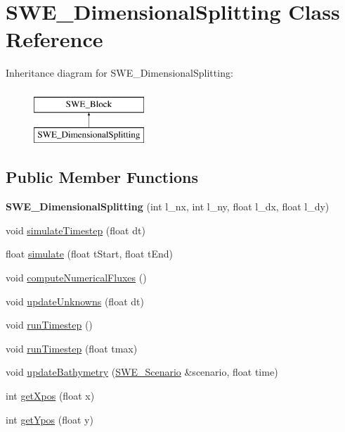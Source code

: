 \hypertarget{classSWE__DimensionalSplitting}{\section{S\-W\-E\-\_\-\-Dimensional\-Splitting Class Reference}
\label{classSWE__DimensionalSplitting}
}
Inheritance diagram for S\-W\-E\-\_\-\-Dimensional\-Splitting\-:\begin{figure}[H]
\begin{center}
\leavevmode
\includegraphics[height=2.000000cm]{classSWE__DimensionalSplitting}
\end{center}
\end{figure}
\subsection*{Public Member Functions}
\begin{DoxyCompactItemize}
\item 
\hypertarget{classSWE__DimensionalSplitting_a3ab0c9de647ca241dbab1aa02cc42a04}{{\bfseries S\-W\-E\-\_\-\-Dimensional\-Splitting} (int l\-\_\-nx, int l\-\_\-ny, float l\-\_\-dx, float l\-\_\-dy)}\label{classSWE__DimensionalSplitting_a3ab0c9de647ca241dbab1aa02cc42a04}

\item 
void \hyperlink{classSWE__DimensionalSplitting_a205a7f520d5c809d940273f09f22661f}{simulate\-Timestep} (float dt)
\item 
float \hyperlink{classSWE__DimensionalSplitting_a7f922283cd593ed0f09a177e9167ef77}{simulate} (float t\-Start, float t\-End)
\item 
void \hyperlink{classSWE__DimensionalSplitting_a84759f8fbbbfe1e46613375515826f0f}{compute\-Numerical\-Fluxes} ()
\item 
void \hyperlink{classSWE__DimensionalSplitting_af74b527ff9ca7727442db92d2e438531}{update\-Unknowns} (float dt)
\item 
void \hyperlink{classSWE__DimensionalSplitting_a41bfc084f565416d3c1c3e9a38bf104c}{run\-Timestep} ()
\item 
void \hyperlink{classSWE__DimensionalSplitting_a24764ff5688b84190e48df61ad44a453}{run\-Timestep} (float tmax)
\item 
void \hyperlink{classSWE__DimensionalSplitting_a874f2fabea21f0c6fbdd447844f7587e}{update\-Bathymetry} (\hyperlink{classSWE__Scenario}{S\-W\-E\-\_\-\-Scenario} \&scenario, float time)
\item 
int \hyperlink{classSWE__DimensionalSplitting_acdb957c5955f90997c48917bf14d6bd4}{get\-Xpos} (float x)
\item 
int \hyperlink{classSWE__DimensionalSplitting_a965c307bfb06ffaf6370784156248a41}{get\-Ypos} (float y)
\end{DoxyCompactItemize}
